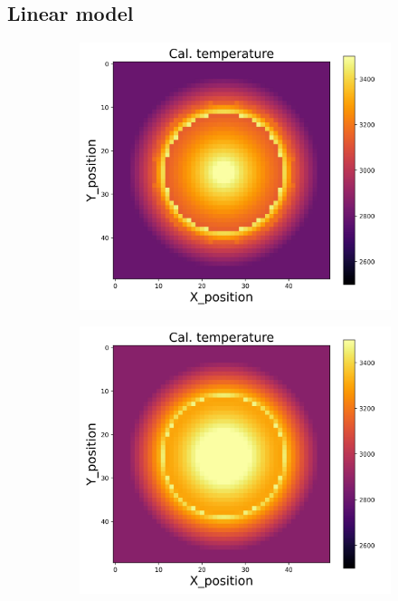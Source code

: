 {\subsection{Linear model}
\begin{figure}[h]
    \centering
    \begin{minipage}{\textwidth}
        \centering
        \begin{subfigure}{0.27\textwidth}
            \centering
            \includegraphics[width=\textwidth]{figures/raw_data/0/T3500/linear/T_cal.jpg}
        \end{subfigure}
        \begin{subfigure}{0.27\textwidth}
            \centering
            \includegraphics[width=\textwidth]{figures/raw_data/5/T3500/linear/T_cal.jpg}

\end{subfigure}
\end{minipage}
\end{figure}}
